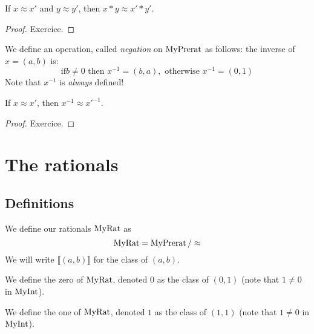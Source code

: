 \begin{lemma}
    \label{MyPrerat.mul_quotient}
    \leanok
If $x \approx x'$ and $y \approx y'$, then $x * y \approx x' * y'$.
\end{lemma}
\begin{proof}
\leanok
Exercice.
\end{proof}

\begin{definition}
    \label{MyPrerat.inv}
    \leanok
We define an operation, called \emph{negation} on $\mathrm{MyPrerat}$ as follows: the inverse of $x = (a,b)$ is:
\[
\mbox{if} b \neq 0 \mbox{ then } x^{-1} = (b, a), \mbox{ otherwise } x^{-1} = (0, 1)
\]
Note that $x^{-1}$ is \emph{always} defined!
\end{definition}

\begin{lemma}
    \label{MyPrerat.inv_quotient}
    \leanok
If $x \approx x'$, then $x^{-1} \approx x'^{-1}$.
\end{lemma}
\begin{proof}
\leanok
Exercice.
\end{proof}

\section{The rationals}

\subsection{Definitions}

\begin{definition}
    \label{MyRat}
    \leanok
    We define our rationals $\mathrm{MyRat}$ as
\[
\mathrm{MyRat} = \mathrm{MyPrerat} \, / \approx
\]
We will write $⟦ (a, b) ⟧$ for the class of $(a,b)$.
\end{definition}

\begin{definition}
    \label{MyRat.zero}
    \leanok
We define the zero of $\mathrm{MyRat}$, denoted $0$ as the class of $(0,1)$ (note that $1 \neq 0$ in $\mathrm{MyInt}$).
\end{definition}

\begin{definition}
    \label{MyRat.one}
    \leanok
We define the one of $\mathrm{MyRat}$, denoted $1$ as the class of $(1,1)$ (note that $1 \neq 0$ in $\mathrm{MyInt}$).
\end{definition}

